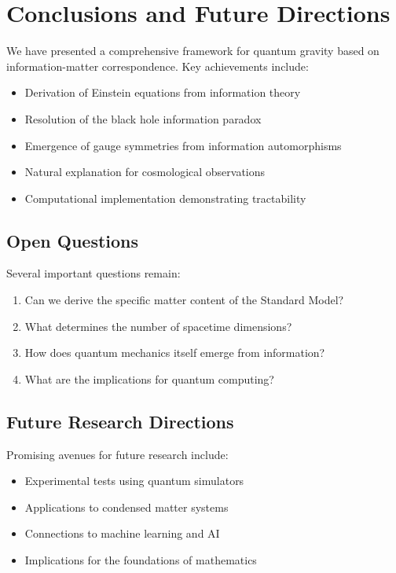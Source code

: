 \documentclass[12pt]{article}
\begin{document}
\section{Conclusions and Future Directions}

We have presented a comprehensive framework for quantum gravity based on information-matter correspondence. Key achievements include:

\begin{itemize}
\item Derivation of Einstein equations from information theory
\item Resolution of the black hole information paradox
\item Emergence of gauge symmetries from information automorphisms
\item Natural explanation for cosmological observations
\item Computational implementation demonstrating tractability
\end{itemize}

\subsection{Open Questions}

Several important questions remain:
\begin{enumerate}
\item Can we derive the specific matter content of the Standard Model?
\item What determines the number of spacetime dimensions?
\item How does quantum mechanics itself emerge from information?
\item What are the implications for quantum computing?
\end{enumerate}

\subsection{Future Research Directions}

Promising avenues for future research include:
\begin{itemize}
\item Experimental tests using quantum simulators
\item Applications to condensed matter systems
\item Connections to machine learning and AI
\item Implications for the foundations of mathematics
\end{itemize}
\end{document}
